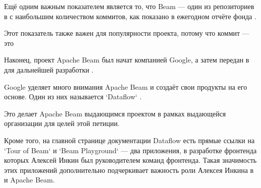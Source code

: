 Ещё одним важным показателем является то, что Beam — один из репозиториев в \Asf
с наибольшим количеством коммитов, как показано в ежегодном отчёте фонда .

Этот показатель также важен для популярности проекта, потому что коммит — это


Наконец, проект Apache Beam был начат компанией Google, а затем передан
в \Asf для дальнейшей разработки .

Google уделяет много внимания Apache Beam и создаёт свои продукты на его основе.
Один из них называется `Dataflow` .

Это делает Apache Beam выдающимся проектом в рамках выдающейся организации
для целей этой петиции.

Кроме того, на главной странице документации Dataflow есть прямые ссылки
на `Tour of Beam` и `Beam Playground`  — два приложения, в разработке фронтенда которых Алексей Инкин был руководителем команд фронтенда.
Такая значимость этих приложений дополнительно подчеркивает
важность роли Алексея Инкина в \Asf и Apache Beam.
